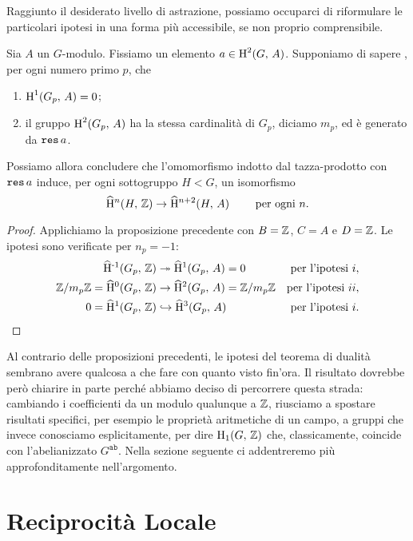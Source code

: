Raggiunto il desiderato livello di astrazione, possiamo occuparci di riformulare le particolari ipotesi in una forma più accessibile, se non proprio comprensibile.

\begin{theorem}
	Sia $ A $ un $ G $-modulo. Fissiamo un elemento $ a \in \operatorname{H}^2(G, \, A) $. Supponiamo di sapere , per ogni numero primo $ p $, che
	\begin{enumerate}[label = \roman*.]
		\item $ \operatorname{H}^1(G_p, \, A) = 0 $;
		\item il gruppo $ \operatorname{H}^2(G_p, \, A) $ ha la stessa cardinalità di $ G_p $, diciamo $ m_p $, ed è generato da $ \operatorname{\mathtt{res}} a $.
	\end{enumerate}
	Possiamo allora concludere che l'omomorfismo indotto dal tazza-prodotto con $ \operatorname{\mathtt{res}} a $ induce, per ogni sottogruppo $ H < G $, un isomorfismo
	\[ \operatorname{\widehat{H}^{\mathnormal{n}}}(H, \, \mathbb{Z}) \to \operatorname{\widehat{H}^{\mathnormal{n}+2}}(H, \,  A) \qquad \text{ per ogni } n.\]
\end{theorem}

\begin{proof}
	Applichiamo la proposizione precedente con $ B = \mathbb{Z} $, $ C = A $ e $ D = \mathbb{Z} $. Le ipotesi sono verificate per $ n_p = -1 $:
	\begin{align*}
		\operatorname{\widehat{H}^{-1}}(G_p,\, \mathbb{Z}) &\twoheadrightarrow \operatorname{\widehat{H}^{1}}(G_p,\, A) = 0 & \text{per l'ipotesi } i, \\
		\mathbb{Z}/m_p\mathbb{Z}=\operatorname{\widehat{H}^{0}}(G_p,\, \mathbb{Z}) &\to \operatorname{\widehat{H}^{2}}(G_p,\, A) = \mathbb{Z}/m_p\mathbb{Z} & \text{per l'ipotesi } ii,\\
		0 = \operatorname{\widehat{H}^{1}}(G_p,\, \mathbb{Z}) &\hookrightarrow \operatorname{\widehat{H}^{3}}(G_p,\, A) & \text{per l'ipotesi } i. 
	\end{align*}
	\qedhere
\end{proof}
Al contrario delle proposizioni precedenti, le ipotesi del teorema di dualità sembrano avere qualcosa a che fare con quanto visto fin'ora. Il risultato dovrebbe però chiarire in parte perché abbiamo deciso di percorrere questa strada: cambiando i coefficienti da un modulo qualunque a $ \mathbb{Z} $, riusciamo a spostare risultati specifici, per esempio le proprietà aritmetiche di un campo, a gruppi che invece conosciamo esplicitamente, per dire $ \operatorname{H}_1(G, \, \mathbb{Z}) $ che, classicamente, coincide con l'abelianizzato $ G^\texttt{ab} $. Nella sezione seguente ci addentreremo più approfonditamente nell'argomento.
\section{Reciprocità Locale}

